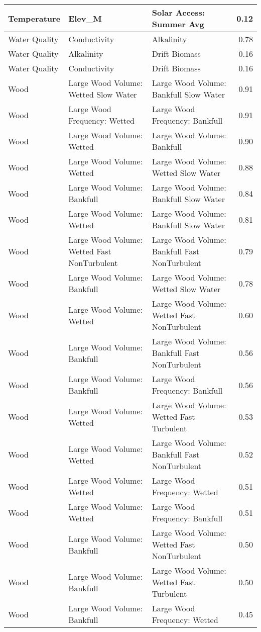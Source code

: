 \documentclass[
  12pt,
]{article}
\begin{document}
\begin{longtable}[t]{>{\raggedright\arraybackslash}p{1in}>{\raggedright\arraybackslash}p{2in}>{\raggedright\arraybackslash}p{2in}r}
Temperature & Elev\_M & Solar Access: Summer Avg & 0.12\\
\hline
Water Quality & Conductivity & Alkalinity & 0.78\\
Water Quality & Alkalinity & Drift Biomass & 0.16\\
Water Quality & Conductivity & Drift Biomass & 0.16\\
\hline
\addlinespace
Wood & Large Wood Volume: Wetted Slow Water & Large Wood Volume: Bankfull Slow Water & 0.91\\
Wood & Large Wood Frequency: Wetted & Large Wood Frequency: Bankfull & 0.91\\
Wood & Large Wood Volume: Wetted & Large Wood Volume: Bankfull & 0.90\\
Wood & Large Wood Volume: Wetted & Large Wood Volume: Wetted Slow Water & 0.88\\
Wood & Large Wood Volume: Bankfull & Large Wood Volume: Bankfull Slow Water & 0.84\\
\addlinespace
Wood & Large Wood Volume: Wetted & Large Wood Volume: Bankfull Slow Water & 0.81\\
Wood & Large Wood Volume: Wetted Fast NonTurbulent & Large Wood Volume: Bankfull Fast NonTurbulent & 0.79\\
Wood & Large Wood Volume: Bankfull & Large Wood Volume: Wetted Slow Water & 0.78\\
Wood & Large Wood Volume: Wetted & Large Wood Volume: Wetted Fast NonTurbulent & 0.60\\
Wood & Large Wood Volume: Bankfull & Large Wood Volume: Bankfull Fast NonTurbulent & 0.56\\
\addlinespace
Wood & Large Wood Volume: Bankfull & Large Wood Frequency: Bankfull & 0.56\\
Wood & Large Wood Volume: Wetted & Large Wood Volume: Wetted Fast Turbulent & 0.53\\
Wood & Large Wood Volume: Wetted & Large Wood Volume: Bankfull Fast NonTurbulent & 0.52\\
Wood & Large Wood Volume: Wetted & Large Wood Frequency: Wetted & 0.51\\
Wood & Large Wood Volume: Wetted & Large Wood Frequency: Bankfull & 0.51\\
\addlinespace
Wood & Large Wood Volume: Bankfull & Large Wood Volume: Wetted Fast NonTurbulent & 0.50\\
Wood & Large Wood Volume: Bankfull & Large Wood Volume: Wetted Fast Turbulent & 0.50\\
Wood & Large Wood Volume: Bankfull & Large Wood Frequency: Wetted & 0.45\\

\end{longtable}
\end{document}
